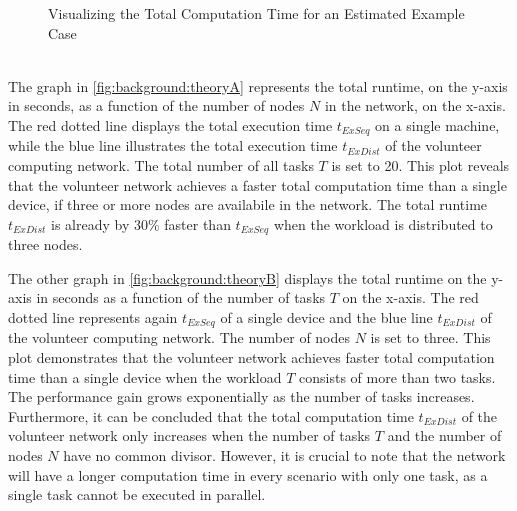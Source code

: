 \begin{figure}[htbp]
  \myfloatalign
   \caption{Visualizing the Total Computation Time for an Estimated Example Case}
   \label{fig:background:theoryplot}
\end{figure}
~\\
The graph in \autoref{fig:background:theoryA} represents the total runtime, on the y-axis in seconds, as a function of the number of nodes $N$ in the network, on the x-axis. The red dotted line displays the total execution time $t_{ExSeq}$ on a single machine, while the blue line illustrates the total execution time $t_{ExDist}$ of the volunteer computing network. The total number of all tasks $T$ is set to 20. This plot reveals that the volunteer network achieves a faster total computation time than a single device, if three or more nodes are availabile in the network. The total runtime $t_{ExDist}$ is already by 30\% faster than $t_{ExSeq}$ when the workload is distributed to three nodes.

The other graph in \autoref{fig:background:theoryB} displays the total runtime on the y-axis in seconds as a function of the number of tasks $T$ on the x-axis. The red dotted line represents again $t_{ExSeq}$ of a single device and the blue line $t_{ExDist}$ of the volunteer computing network. The number of nodes $N$ is set to three. This plot demonstrates that the volunteer network achieves faster total computation time than a single device when the workload $T$ consists of more than two tasks. The performance gain grows exponentially as the number of tasks increases. Furthermore, it can be concluded that the total computation time $t_{ExDist}$ of the volunteer network only increases when the number of tasks $T$ and the number of nodes $N$ have no common divisor. However, it is crucial to note that the network will have a longer computation time in every scenario with only one task, as a single task cannot be executed in parallel.

